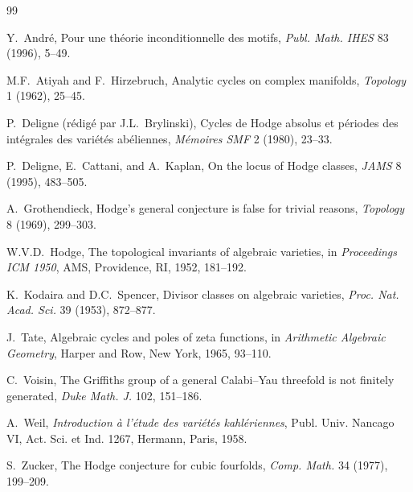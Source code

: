 \documentclass[11pt,a4paper]{article}
\theoremstyle{plain}
\theoremstyle{definition}
\begin{document}
\begin{thebibliography}{99}

Y.~Andr\'e, Pour une th\'eorie inconditionnelle des motifs, \emph{Publ. Math. IHES} 83 (1996), 5--49.

M.F.~Atiyah and F.~Hirzebruch, Analytic cycles on complex manifolds, \emph{Topology} 1 (1962), 25--45.

P.~Deligne (r\'edig\'e par J.L.~Brylinski), Cycles de Hodge absolus et p\'eriodes des int\'egrales des vari\'et\'es ab\'eliennes, \emph{M\'emoires SMF} 2 (1980), 23--33.

P.~Deligne, E.~Cattani, and A.~Kaplan, On the locus of Hodge classes, \emph{JAMS} 8 (1995), 483--505.

A.~Grothendieck, Hodge's general conjecture is false for trivial reasons, \emph{Topology} 8 (1969), 299--303.

W.V.D.~Hodge, The topological invariants of algebraic varieties, in \emph{Proceedings ICM 1950}, AMS, Providence, RI, 1952, 181--192.

K.~Kodaira and D.C.~Spencer, Divisor classes on algebraic varieties, \emph{Proc. Nat. Acad. Sci.} 39 (1953), 872--877.

J.~Tate, Algebraic cycles and poles of zeta functions, in \emph{Arithmetic Algebraic Geometry}, Harper and Row, New York, 1965, 93--110.

C.~Voisin, The Griffiths group of a general Calabi--Yau threefold is not finitely generated, \emph{Duke Math. J.} 102, 151--186.

A.~Weil, \emph{Introduction \`a l'\'etude des vari\'et\'es kahl\'eriennes}, Publ. Univ. Nancago VI, Act. Sci. et Ind. 1267, Hermann, Paris, 1958.

S.~Zucker, The Hodge conjecture for cubic fourfolds, \emph{Comp. Math.} 34 (1977), 199--209.

\end{thebibliography}
\end{document}
